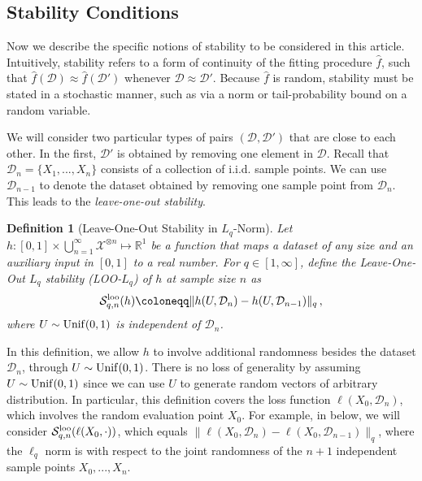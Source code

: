 \documentclass[11pt]{article}
\theoremstyle{plain}
\newtheorem{definition}[theorem]{Definition}
\newcommand{\D}{{\mathcal{D}}}
\newcommand{\X}{{\mathcal{X}}}
\begin{document}
\subsection{Stability Conditions}\label{subsec:stability_overview}
Now we describe the specific notions of stability to be considered in this article.  Intuitively, stability refers to a form of continuity of the fitting procedure $\hat f$, such that $\hat f(\D)\approx \hat f(\D')$ whenever $\mathcal D\approx \mathcal D'$.  
Because $\hat f$ is random, stability must be stated in a stochastic manner, such as via a norm or tail-probability bound on a random variable. 

We will consider two particular types of pairs $(\D,\D')$ that are close to each other. 
In the first, $\D'$ is obtained by removing one element in $\D$. Recall that $\D_n=\{X_1,...,X_n\}$ consists of a collection of i.i.d. sample points. We can use $\D_{n-1}$ to denote the dataset obtained by removing one sample point from $\D_n$. This leads to the \emph{leave-one-out stability}.
\begin{definition}[Leave-One-Out Stability in $L_q$-Norm]\label{def:2.2-loo-stab-lq}
    Let $h:[0,1]\times\bigcup_{n=1}^\infty \X^{\otimes n}\mapsto\mathbb R^1$ be a function that maps a dataset of any size and an auxiliary input in $[0,1]$ to a real number. 
For $q\in[1,\infty]$, define the Leave-One-Out $L_q$ stability (LOO-$L_q$) of $h$ at sample size $n$ as
    $$
  \mathcal S_{q,n}^{\rm loo}(h)\coloneqq  \|h(U,\D_n)-h(U,\D_{n-1})\|_q\,,
    $$
    where $U\sim {\rm Unif}(0,1)$ is independent of $\mathcal D_n$.
\end{definition}

In this definition, we allow $h$ to involve additional randomness besides the dataset $\D_n$, through $U\sim {\rm Unif}(0,1)$. There is no loss of generality by assuming $U\sim{\rm Unif}(0,1)$ since we can use $U$ to generate random vectors of arbitrary distribution.  In particular, this definition covers the loss function $\ell(X_0,\D_n)$, which involves the random evaluation point $X_0$.  For example, in  below, we will consider
$\mathcal S_{q,n}^{\rm loo}(\ell(X_0,\cdot))$, which equals
$\|\ell(X_0,\mathcal D_n)-\ell(X_0,\mathcal D_{n-1})\|_q$, where the $\ell_q$ norm is with respect to the joint randomness of the $n+1$ independent sample points $X_0,...,X_n$.
\end{document}
